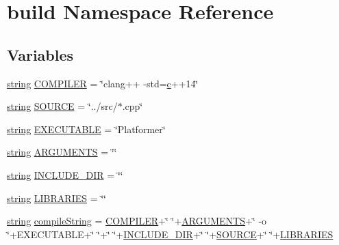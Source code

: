 \hypertarget{namespacebuild}{}\section{build Namespace Reference}
\label{namespacebuild}
\subsection*{Variables}
\begin{DoxyCompactItemize}
\item 
\mbox{\hyperlink{_s_d_l__opengl__glext_8h_ae84541b4f3d8e1ea24ec0f466a8c568b}{string}} \mbox{\hyperlink{namespacebuild_aa75f224fbf929d8e46d1d31968ee6451}{C\+O\+M\+P\+I\+L\+ER}} = \char`\"{}clang++ -\/std=\mbox{\hyperlink{_s_d_l__opengl__glext_8h_a1f2d7f8147412c43ba2303a56f97ee73}{c}}++14\char`\"{}
\item 
\mbox{\hyperlink{_s_d_l__opengl__glext_8h_ae84541b4f3d8e1ea24ec0f466a8c568b}{string}} \mbox{\hyperlink{namespacebuild_a832e50b60ae1bc20032caf0540c2176b}{S\+O\+U\+R\+CE}} = \char`\"{}../src/$\ast$.cpp\char`\"{}
\item 
\mbox{\hyperlink{_s_d_l__opengl__glext_8h_ae84541b4f3d8e1ea24ec0f466a8c568b}{string}} \mbox{\hyperlink{namespacebuild_ad848a55f54f2234a8c862b0c3597ac1b}{E\+X\+E\+C\+U\+T\+A\+B\+LE}} = \char`\"{}Platformer\char`\"{}
\item 
\mbox{\hyperlink{_s_d_l__opengl__glext_8h_ae84541b4f3d8e1ea24ec0f466a8c568b}{string}} \mbox{\hyperlink{namespacebuild_a1bf544daac24c8c493f0bcab1fdddd32}{A\+R\+G\+U\+M\+E\+N\+TS}} = \char`\"{}\char`\"{}
\item 
\mbox{\hyperlink{_s_d_l__opengl__glext_8h_ae84541b4f3d8e1ea24ec0f466a8c568b}{string}} \mbox{\hyperlink{namespacebuild_a5d6144bd70c120b901b0047a008b89ad}{I\+N\+C\+L\+U\+D\+E\+\_\+\+D\+IR}} = \char`\"{}\char`\"{}
\item 
\mbox{\hyperlink{_s_d_l__opengl__glext_8h_ae84541b4f3d8e1ea24ec0f466a8c568b}{string}} \mbox{\hyperlink{namespacebuild_a88bc45090f5d9a0b72dc833bfe64e032}{L\+I\+B\+R\+A\+R\+I\+ES}} = \char`\"{}\char`\"{}
\item 
\mbox{\hyperlink{_s_d_l__opengl__glext_8h_ae84541b4f3d8e1ea24ec0f466a8c568b}{string}} \mbox{\hyperlink{namespacebuild_aad7d648a6e7eb1f6b36140a180580b24}{compile\+String}} = \mbox{\hyperlink{namespacebuild_aa75f224fbf929d8e46d1d31968ee6451}{C\+O\+M\+P\+I\+L\+ER}}+\char`\"{} \char`\"{}+\mbox{\hyperlink{namespacebuild_a1bf544daac24c8c493f0bcab1fdddd32}{A\+R\+G\+U\+M\+E\+N\+TS}}+\char`\"{} -\/o \char`\"{}+E\+X\+E\+C\+U\+T\+A\+B\+LE+\char`\"{} \char`\"{}+\char`\"{} \char`\"{}+\mbox{\hyperlink{namespacebuild_a5d6144bd70c120b901b0047a008b89ad}{I\+N\+C\+L\+U\+D\+E\+\_\+\+D\+IR}}+\char`\"{} \char`\"{}+\mbox{\hyperlink{namespacebuild_a832e50b60ae1bc20032caf0540c2176b}{S\+O\+U\+R\+CE}}+\char`\"{} \char`\"{}+\mbox{\hyperlink{namespacebuild_a88bc45090f5d9a0b72dc833bfe64e032}{L\+I\+B\+R\+A\+R\+I\+ES}}
\end{DoxyCompactItemize}


